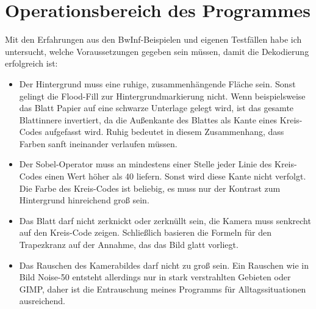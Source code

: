 \section {Operationsbereich des Programmes}
Mit den Erfahrungen aus den BwInf-Beispielen und eigenen Testfällen habe ich untersucht, welche Voraussetzungen gegeben sein müssen, damit die Dekodierung erfolgreich ist:
\begin{itemize}
	\item Der Hintergrund muss eine ruhige, zusammenhängende Fläche sein. Sonst gelingt die Flood-Fill zur Hintergrundmarkierung nicht. Wenn beispielsweise das Blatt Papier auf eine schwarze Unterlage gelegt wird, ist das gesamte Blattinnere invertiert, da die Außenkante des Blattes als Kante eines Kreis-Codes aufgefasst wird. Ruhig bedeutet in diesem Zusammenhang, dass Farben sanft ineinander verlaufen müssen.
	\item Der Sobel-Operator muss an mindestens einer Stelle jeder Linie des Kreis-Codes einen Wert höher als 40 liefern. Sonst wird diese Kante nicht verfolgt. Die Farbe des Kreis-Codes ist beliebig, es muss nur der Kontrast zum Hintergrund hinreichend groß sein.
	\item Das Blatt darf nicht zerknickt oder zerknüllt sein, die Kamera muss senkrecht auf den Kreis-Code zeigen. Schließlich basieren die Formeln für den Trapezkranz auf der Annahme, das das Bild glatt vorliegt. 
	\item Das Rauschen des Kamerabildes darf nicht zu groß sein. Ein Rauschen wie in Bild Noise-50 entsteht allerdings nur in stark verstrahlten Gebieten oder GIMP, daher ist die Entrauschung meines Programms für Alltagssituationen ausreichend.
\end{itemize}